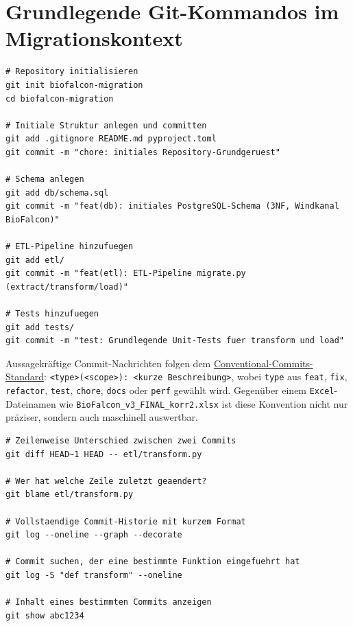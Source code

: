 ﻿\documentclass[12pt,a4paper]{report}
\theoremstyle{definition}
\theoremstyle{remark}
\newcommand{\excel}{\texttt{Excel}}
\newcommand{\code}[1]{\texttt{#1}}
\begin{document}
\section{Grundlegende Git-Kommandos im Migrationskontext}

\begin{lstlisting}[style=bash, caption={Repository initialisieren und Erstzustand sichern}]
# Repository initialisieren
git init biofalcon-migration
cd biofalcon-migration

# Initiale Struktur anlegen und committen
git add .gitignore README.md pyproject.toml
git commit -m "chore: initiales Repository-Grundgeruest"

# Schema anlegen
git add db/schema.sql
git commit -m "feat(db): initiales PostgreSQL-Schema (3NF, Windkanal BioFalcon)"

# ETL-Pipeline hinzufuegen
git add etl/
git commit -m "feat(etl): ETL-Pipeline migrate.py (extract/transform/load)"

# Tests hinzufuegen
git add tests/
git commit -m "test: Grundlegende Unit-Tests fuer transform und load"
\end{lstlisting}

Aussagekräftige Commit-Nachrichten folgen dem
\href{https://www.conventionalcommits.org/}{Conventional-Commits-Standard}:
\code{<type>(<scope>): <kurze Beschreibung>}, wobei \code{type} aus
\code{feat}, \code{fix}, \code{refactor}, \code{test}, \code{chore},
\code{docs} oder \code{perf} gewählt wird.
Gegenüber einem \excel-Dateinamen wie \code{BioFalcon\_\newline v3\_FINAL\_korr2.xlsx}
ist diese Konvention nicht nur präziser, sondern auch maschinell auswertbar.

\begin{lstlisting}[style=bash, caption={Diff und Blame: Nachvollziehen von Aenderungen}]
# Zeilenweise Unterschied zwischen zwei Commits
git diff HEAD~1 HEAD -- etl/transform.py

# Wer hat welche Zeile zuletzt geaendert?
git blame etl/transform.py

# Vollstaendige Commit-Historie mit kurzem Format
git log --oneline --graph --decorate

# Commit suchen, der eine bestimmte Funktion eingefuehrt hat
git log -S "def transform" --oneline

# Inhalt eines bestimmten Commits anzeigen
git show abc1234
\end{lstlisting}
\end{document}
